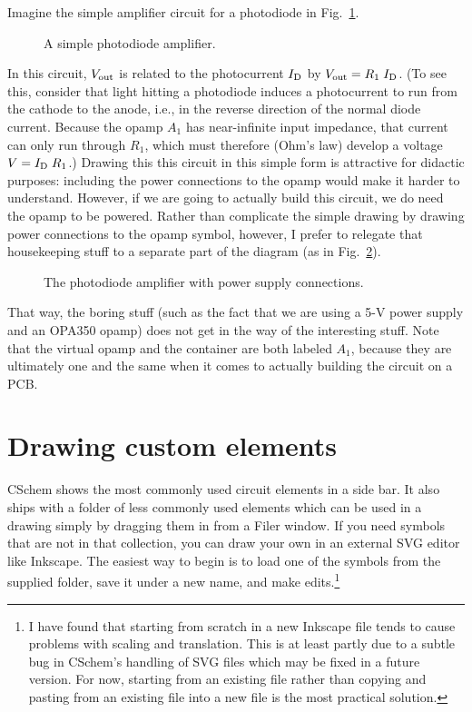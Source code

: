 \documentclass[11pt]{report}
\begin{document}
Imagine the simple amplifier circuit for a photodiode in Fig.~\ref{pdamp}.
%
\begin{figure}[h]
  \mbox{}\hfill{}\hfill\mbox{}
  \caption{A simple photodiode amplifier.}\label{pdamp}
\end{figure}
%
\def\sub#1{\textrm{\scriptsize#1}}
In this circuit, $V_\textrm{\scriptsize out}$ is related to the photocurrent
$I_\sub{D}$ by $V_\sub{out} = R_1\;I_\sub{D}$. (To see this, consider that light
hitting a photodiode induces a photocurrent to run from the cathode to
the anode, i.e., in the reverse direction of the normal diode
current. Because the opamp $A_1$ has near-infinite input impedance,
that current can only run through $R_1$, which must therefore (Ohm's law) develop
a voltage $V = I_\sub{D}\;R_1$.) Drawing this this circuit in
this simple form is attractive for didactic purposes: including the power connections to the opamp would
make it harder to understand. However, if we are going to actually
build this circuit, we do need the opamp to be powered. Rather than
complicate the simple drawing by
drawing power connections to the opamp symbol, however, I prefer to relegate
that housekeeping stuff to a separate part of the diagram (as in Fig.~\ref{pdampcont}).
%
\begin{figure}[h]
  \mbox{}\hfill{}\hfill\mbox{}
  \caption{The photodiode amplifier with power supply
    connections.}\label{pdampcont}
\end{figure}
%
That way, the boring stuff (such as the fact that we are using a 5-V
power supply and an OPA350 opamp) does not get in the way of the
interesting stuff. Note that the virtual opamp and the container are
both labeled $A_1$, because they are ultimately one and the same when
it comes to actually building the circuit on a PCB.

\section{Drawing custom elements}\label{sec.custom}

CSchem shows the most commonly used circuit elements in a side bar. It
also ships with a folder of less commonly used elements which can be
used in a drawing simply by dragging them in from a Filer window. If
you need symbols that are not in that collection, you can draw your
own in an external SVG editor like Inkscape. The easiest way to begin
is to load one of the symbols from the supplied folder, save it under
a new name, and make edits.\footnote{I have found that starting from scratch
in a new Inkscape file tends to cause problems with scaling and
translation. This is at least partly due to a subtle bug in CSchem's handling
of SVG files which may be fixed in a future version. For now, starting
from an existing file rather than copying and pasting from an existing
file into a new file is the most practical solution.}
\end{document}

